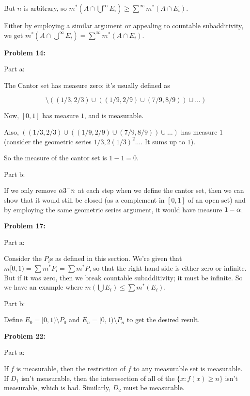 \documentclass[a4paper,12pt]{article}
\begin{document}
But $n$ is arbitrary, so $m^*(A \cap \bigcup\limits^\infty E_i) \geq \sum\limits^\infty m^*(A \cap E_i)$.

Either by employing a similar argument or appealing to countable subadditivity, we get $m^*(A \cap \bigcup\limits^\infty E_i) = \sum\limits^\infty m^*(A \cap E_i)$.

\shunt

{\bf Problem 14:}

Part a:

The Cantor set has measure zero; it's usually defined as

\begin{displaymath}
[0,1] \setminus ((1/3,2/3) \cup ((1/9,2/9) \cup (7/9,8/9)) \cup \ldots)
\end{displaymath}

Now, $[0,1]$ has measure $1$, and is measurable.

Also, $((1/3,2/3) \cup ((1/9,2/9) \cup (7/9,8/9)) \cup \ldots)$ has measure $1$ (consider the geometric series $1/3, 2(1/3)^2 \ldots$. It sums up to $1$).

So the measure of the cantor set is $1-1=0$.

\shunt

Part b:

If we only remove $\alpha 3^-n$ at each step when we define the cantor set, then we can show that it would still be closed (as a complement in $[0,1]$ of an open set) and by employing the same geometric series argument, it would have measure $1-\alpha$.

\shunt

{\bf Problem 17:}

Part a:

Consider the $P_i$s as defined in this section. We're given that $m[0,1) = \sum m^*P_i = \sum m^*P$, so that the right hand side is either zero or infinite. But if it was zero, then we break countable subadditivity; it must be infinite. So we have an example where $m(\bigcup E_i) \leq \sum m^*(E_i)$.

\shunt

Part b:

Define $E_0 = [0,1) \setminus P_0$ and $E_n = [0,1) \setminus P_n$ to get the desired result.

\shunt

{\bf Problem 22:}

Part a:

If $f$ is measurable, then the restriction of $f$ to any measurable set is measurable. If $D_1$ isn't measurable, then the interesection of all of the $\{x: f(x) \geq n\}$ isn't measurable, which is bad. Similarly, $D_2$ must be measurable.
\end{document}
